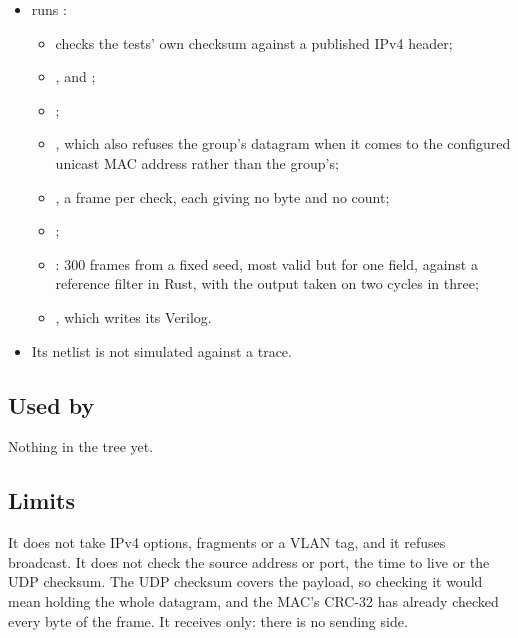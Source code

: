 \begin{itemize}
\item {} runs :
\begin{itemize}
\item {}
checks the tests' own checksum against a published IPv4 header;
\item {},
 and
;
\item {};
\item {}, which
also refuses the group's datagram when it comes to the configured
unicast MAC address rather than the group's;
\item {}, a frame per check,
each giving no byte and no count;
\item {};
\item {}: 300 frames
from a fixed seed, most valid but for one field, against a reference
filter in Rust, with the output taken on two cycles in three;
\item {}, which writes its Verilog.
\end{itemize}
\item Its netlist is not simulated against a trace.
\end{itemize}

\subsection*{Used by}

Nothing in the tree yet.

\subsection*{Limits}

It does not take IPv4 options, fragments or a VLAN tag, and it
refuses broadcast. It does not check the source address or port, the
time to live or the UDP checksum. The UDP checksum covers the payload,
so checking it would mean holding the whole datagram, and the MAC's
CRC-32 has already checked every byte of the frame. It receives only:
there is no sending side.
